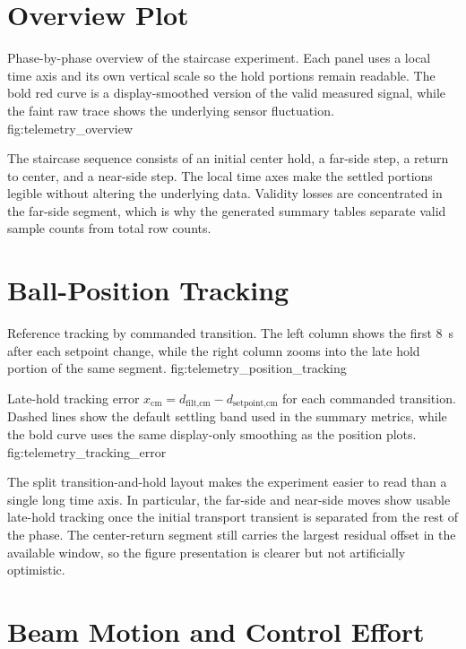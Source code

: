 \section{Overview Plot}

  {Phase-by-phase overview of the staircase experiment. Each panel uses a local time
  axis and its own vertical scale so the hold portions remain readable. The bold red
  curve is a display-smoothed version of the valid measured signal, while the faint raw
  trace shows the underlying sensor fluctuation.}
  {fig:telemetry_overview}

The staircase sequence consists of an initial center hold, a far-side step, a return to
center, and a near-side step. The local time axes make the settled portions legible
without altering the underlying data. Validity losses are concentrated in the far-side
segment, which is why the generated summary tables separate valid sample counts from
total row counts.

\section{Ball-Position Tracking}

  {Reference tracking by commanded transition. The left column shows the first
  \SI{8}{s} after each setpoint change, while the right column zooms into the late hold
  portion of the same segment.}
  {fig:telemetry_position_tracking}

  {Late-hold tracking error
  $x_{\text{cm}} = d_{\text{filt,cm}} - d_{\text{setpoint,cm}}$ for each commanded
  transition. Dashed lines show the default settling band used in the summary metrics,
  while the bold curve uses the same display-only smoothing as the position plots.}
  {fig:telemetry_tracking_error}

The split transition-and-hold layout makes the experiment easier to read than a single
long time axis. In particular, the far-side and near-side moves show usable late-hold
tracking once the initial transport transient is separated from the rest of the phase.
The center-return segment still carries the largest residual offset in the available
window, so the figure presentation is clearer but not artificially optimistic.

\section{Beam Motion and Control Effort}


